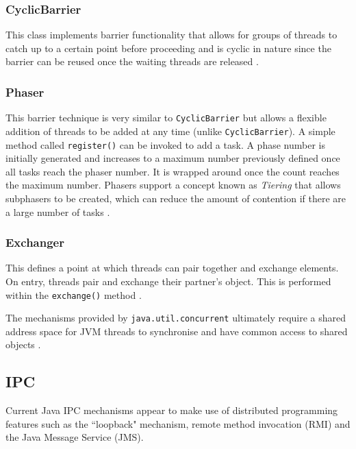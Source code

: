 \documentclass[12pt] {newrucsthesis}    %
\def\code#1{\texttt{#1}}
\begin{document}
        \subsubsection{CyclicBarrier}
          This class implements barrier functionality that allows for groups of threads to catch
          up to a certain point before proceeding and is cyclic in nature since the barrier can be
          reused once the waiting threads are released \citep{JavaAPI}.

        \subsubsection{Phaser}
          This barrier technique is very similar to \code{CyclicBarrier} but allows a flexible addition of
          threads to be added at any time (unlike \code{CyclicBarrier}). A simple method called \code{register()}
          can be invoked to add a task. A phase number is initially generated and increases to a maximum number
          previously defined once all tasks reach the phaser number. It is wrapped around once the count reaches
          the maximum number. Phasers support a concept known as \textit{Tiering} that allows subphasers to be created,
          which can reduce the amount of contention if there are a large number of tasks \cite{JavaAPI}.

        \subsubsection{Exchanger}
          This defines a point at which threads can pair together and exchange elements. On entry,
          threads pair and exchange their partner's object. This is performed within the \code{exchange()}
          method \citep{JavaAPI}.

      The mechanisms provided by \code{java.util.concurrent} ultimately require a shared
      address space for JVM threads to synchronise and have common access to shared objects
      \citep{WellsIPCMultiProc}.

      \subsection{IPC}
        Current Java IPC mechanisms appear to make use of distributed programming features such
        as the ``loopback" mechanism, remote method invocation (RMI) and the Java Message Service (JMS).
\end{document}
